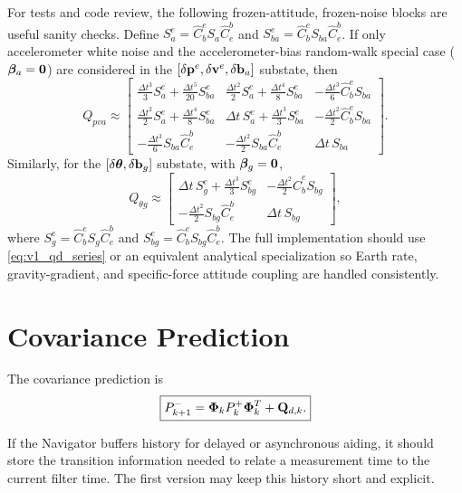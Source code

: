For tests and code review, the following frozen-attitude, frozen-noise blocks
are useful sanity checks. Define
$S_a^e=\hat{C}_b^eS_a\hat{C}_e^b$ and
$S_{ba}^e=\hat{C}_b^eS_{ba}\hat{C}_e^b$. If only accelerometer white noise
and the accelerometer-bias random-walk special case
($\boldsymbol{\beta}_a=\mathbf{0}$) are considered in the
$[\delta\mathbf{p}^e,\delta\mathbf{v}^e,\delta\mathbf{b}_a]$ substate, then
\begin{equation}
Q_{pva}
\approx
\begin{bmatrix}
\frac{\Delta t^3}{3}S_a^e+\frac{\Delta t^5}{20}S_{ba}^e &
\frac{\Delta t^2}{2}S_a^e+\frac{\Delta t^4}{8}S_{ba}^e &
-\frac{\Delta t^3}{6}\hat{C}_b^eS_{ba}\\
\frac{\Delta t^2}{2}S_a^e+\frac{\Delta t^4}{8}S_{ba}^e &
\Delta t\,S_a^e+\frac{\Delta t^3}{3}S_{ba}^e &
-\frac{\Delta t^2}{2}\hat{C}_b^eS_{ba}\\
-\frac{\Delta t^3}{6}S_{ba}\hat{C}_e^b &
-\frac{\Delta t^2}{2}S_{ba}\hat{C}_e^b &
\Delta t\,S_{ba}
\end{bmatrix}.
\end{equation}
Similarly, for the $[\delta\boldsymbol{\theta},\delta\mathbf{b}_g]$ substate,
with $\boldsymbol{\beta}_g=\mathbf{0}$,
\begin{equation}
Q_{\theta g}
\approx
\begin{bmatrix}
\Delta t\,S_g^e+\frac{\Delta t^3}{3}S_{bg}^e &
-\frac{\Delta t^2}{2}\hat{C}_b^eS_{bg}\\
-\frac{\Delta t^2}{2}S_{bg}\hat{C}_e^b &
\Delta t\,S_{bg}
\end{bmatrix},
\end{equation}
where $S_g^e=\hat{C}_b^eS_g\hat{C}_e^b$ and
$S_{bg}^e=\hat{C}_b^eS_{bg}\hat{C}_e^b$. The full implementation should use
\cref{eq:v1_qd_series} or an equivalent analytical specialization so Earth
rate, gravity-gradient, and specific-force attitude coupling are handled
consistently.

\section{Covariance Prediction}

The covariance prediction is
\begin{equation}
\boxed{
P_{k+1}^{-}
=
\boldsymbol{\Phi}_k P_k^{+}\boldsymbol{\Phi}_k^T + \mathbf{Q}_{d,k}.
}
\label{eq:v1_covariance_prediction}
\end{equation}

If the Navigator buffers history for delayed or asynchronous aiding, it should
store the transition information needed to relate a measurement time to the
current filter time. The first version may keep this history short and
explicit.
